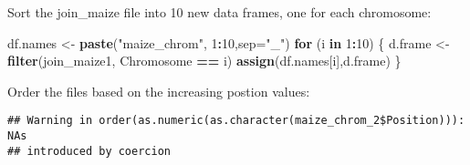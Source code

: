 \documentclass[]{article}
\newenvironment{Shaded}{\begin{snugshade}}{\end{snugshade}}
\newcommand{\ControlFlowTok}[1]{\textcolor[rgb]{0.13,0.29,0.53}{\textbf{#1}}}
\newcommand{\DataTypeTok}[1]{\textcolor[rgb]{0.13,0.29,0.53}{#1}}
\newcommand{\DecValTok}[1]{\textcolor[rgb]{0.00,0.00,0.81}{#1}}
\newcommand{\KeywordTok}[1]{\textcolor[rgb]{0.13,0.29,0.53}{\textbf{#1}}}
\newcommand{\NormalTok}[1]{#1}
\newcommand{\OperatorTok}[1]{\textcolor[rgb]{0.81,0.36,0.00}{\textbf{#1}}}
\newcommand{\StringTok}[1]{\textcolor[rgb]{0.31,0.60,0.02}{#1}}
\begin{document}
Sort the join\_maize file into 10 new data frames, one for each
chromosome:

\begin{Shaded}
\begin{Highlighting}[]
\NormalTok{df.names <-}\StringTok{ }\KeywordTok{paste}\NormalTok{(}\StringTok{"maize_chrom"}\NormalTok{, }\DecValTok{1}\OperatorTok{:}\DecValTok{10}\NormalTok{,}\DataTypeTok{sep=}\StringTok{"_"}\NormalTok{)}
\ControlFlowTok{for}\NormalTok{ (i }\ControlFlowTok{in} \DecValTok{1}\OperatorTok{:}\DecValTok{10}\NormalTok{) \{}
\NormalTok{  d.frame <-}\StringTok{ }\KeywordTok{filter}\NormalTok{(join_maize1, Chromosome }\OperatorTok{==}\StringTok{ }\NormalTok{i)}
  \KeywordTok{assign}\NormalTok{(df.names[i],d.frame)}
\NormalTok{\}}
\end{Highlighting}
\end{Shaded}

Order the files based on the increasing postion values:

\begin{Shaded}
\end{Shaded}

\begin{verbatim}
## Warning in order(as.numeric(as.character(maize_chrom_2$Position))): NAs
## introduced by coercion
\end{verbatim}

\begin{Shaded}
\end{Shaded}
\end{document}
